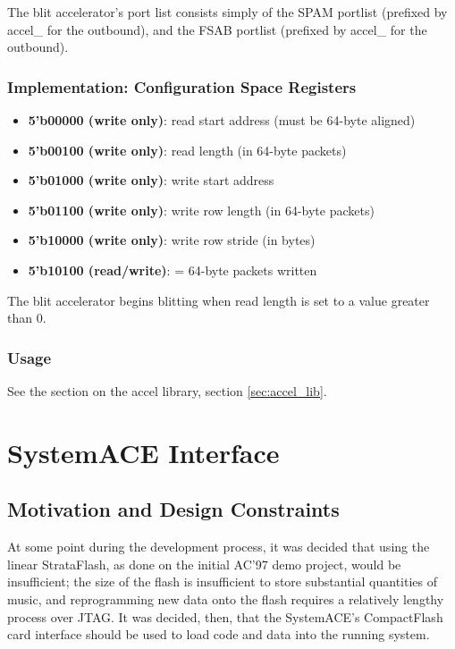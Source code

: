 \documentclass[10pt]{article}
\begin{document}
The blit accelerator's port list consists simply of the SPAM portlist
(prefixed by accel\_ for the outbound), and the FSAB portlist (prefixed by
accel\_ for the outbound).

\subsubsection{Implementation: Configuration Space Registers}

\begin{itemize}
\item{\textbf{5'b00000 (write only)}: read start address (must be 64-byte
aligned)}
\item{\textbf{5'b00100 (write only)}: read length (in 64-byte packets)}
\item{\textbf{5'b01000 (write only)}: write start address}
\item{\textbf{5'b01100 (write only)}: write row length (in 64-byte packets)}
\item{\textbf{5'b10000 (write only)}: write row stride (in bytes)}
\item{\textbf{5'b10100 (read/write)}: = 64-byte packets written}
\end{itemize}

The blit accelerator begins blitting when read length is set to a value greater
than 0.

\subsubsection{Usage}

See the section on the accel library, section \ref{sec:accel_lib}.

\section{SystemACE Interface}

\subsection{Motivation and Design Constraints}
At some point during the development process, it was decided that using the
linear StrataFlash, as done on the initial AC'97 demo project, would be
insufficient; the size of the flash is insufficient to store substantial
quantities of music, and reprogramming new data onto the flash requires a
relatively lengthy process over JTAG. It was decided, then, that the
SystemACE's CompactFlash card interface should be used to load code and data
into the running system.
\end{document}
